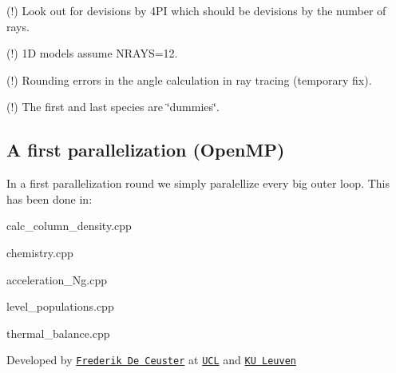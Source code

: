(!) Look out for devisions by 4\+PI which should be devisions by the number of rays.

(!) 1D models assume N\+R\+A\+YS=12.

(!) Rounding errors in the angle calculation in ray tracing (temporary fix).

(!) The first and last species are \char`\"{}dummies\char`\"{}.

\subsection*{A first parallelization (Open\+MP)}

In a first parallelization round we simply paralellize every big outer loop. This has been done in\+:


\begin{DoxyItemize}
\item calc\+\_\+column\+\_\+density.\+cpp
\item chemistry.\+cpp
\item acceleration\+\_\+\+Ng.\+cpp
\item level\+\_\+populations.\+cpp
\item thermal\+\_\+balance.\+cpp
\end{DoxyItemize}





Developed by \href{https://github.com/FrederikDeCeuster}{\tt Frederik De Ceuster} at \href{https://github.com/ucl}{\tt U\+CL} and \href{https://github.com/IvS-KULeuven}{\tt KU Leuven} 